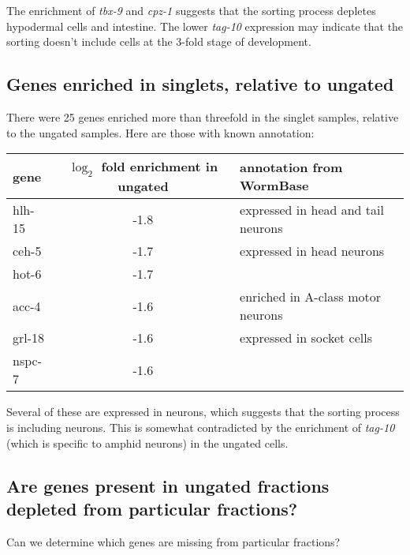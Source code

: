 \documentclass{article}
\begin{document}
The enrichment of {\em tbx-9}
and {\em cpz-1} suggests that the sorting process depletes hypodermal cells and
intestine. The lower {\em tag-10} expression may indicate that the sorting
doesn't include cells at the 3-fold stage of development.

\subsection*{Genes enriched in singlets, relative to ungated}

There were 25 genes enriched more than threefold in the singlet samples,
relative to the ungated samples. Here are those with known annotation:

\begin{tabular}{lcl}
gene & $\log_2$ fold enrichment in ungated & annotation from WormBase \\
\hline
hlh-15 & -1.8 & expressed in head and tail neurons \\
ceh-5 & -1.7 & expressed in head neurons \\
hot-6 & -1.7 &  \\
acc-4 & -1.6 & enriched in A-class motor neurons  \\
grl-18 & -1.6 & expressed in socket cells \\
nspc-7 & -1.6 &   \\
\end{tabular}

Several of these are expressed in neurons, which suggests that the
sorting process is including
neurons. This is somewhat contradicted by the enrichment of {\em tag-10}
(which is specific to amphid neurons)
in the ungated cells.

\subsection*{Are genes present in ungated fractions
depleted from particular fractions?}

Can we determine which genes are missing from particular fractions?
\end{document}
